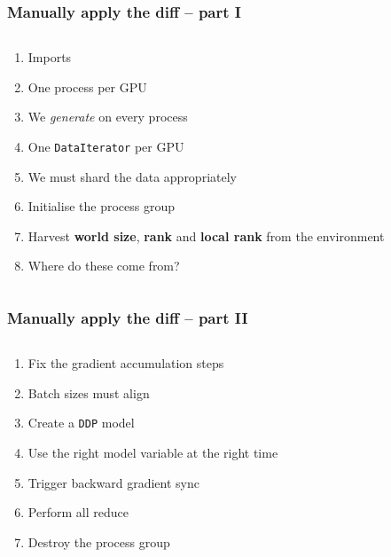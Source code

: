 \documentclass[
	notes=none,
	aspectratio=169
]{beamer}
\begin{document}
\begin{frame}
\frametitle{Manually apply the diff -- part I}

\begin{columns}[T]
\begin{column}[T]{1.0\textwidth}
\setlength{\parskip}{0.5em}

\vspace{0.0cm}
\begin{enumerate}
\setlength{\parskip}{0.0em}
\item Imports
\item One process per GPU
\item We {\it generate\/} on every process
\item One {\tt DataIterator} per GPU
\item We must shard the data appropriately
\item Initialise the process group
\item Harvest {\bf world size}, {\bf rank} and {\bf local rank} from the environment
\item Where do these come from?
\end{enumerate}

\end{column}
\end{columns}

\end{frame}
\note{
}


\begin{frame}
\frametitle{Manually apply the diff -- part II}

\begin{columns}[T]
\begin{column}[T]{1.0\textwidth}
\setlength{\parskip}{0.5em}

\vspace{0.0cm}
\begin{enumerate}
\setlength{\parskip}{0.0em}
\setcounter{enumi}{8}
\item Fix the gradient accumulation steps
\item Batch sizes must align
\item Create a {\tt DDP} model
\item Use the right model variable at the right time
\item Trigger backward gradient sync
\item Perform all reduce
\item Destroy the process group
\end{enumerate}

\end{column}
\end{columns}

\end{frame}
\note{
}
\end{document}
